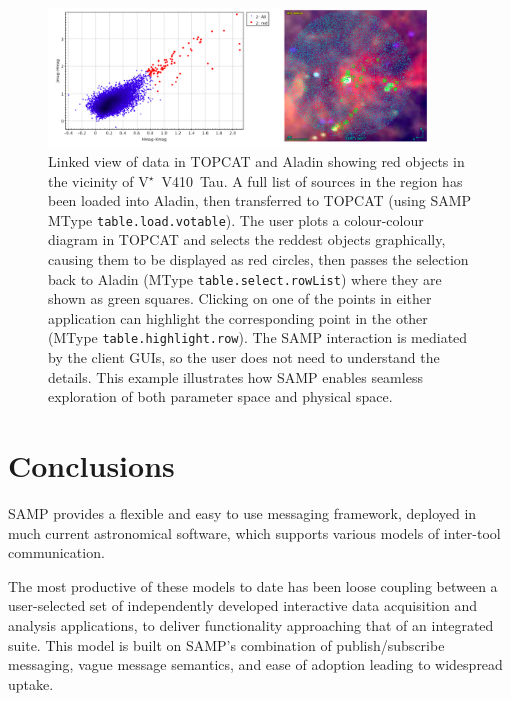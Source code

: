\documentclass[5p]{elsarticle}
\begin{document}
\begin{figure}
\begin{center}
\includegraphics[width=0.9\textwidth]{SAMP-AC_aladin-topcat.png}
\end{center}
\caption{\label{fig:linked}
Linked view of data in TOPCAT and Aladin showing
red objects in the vicinity of V$^{\star}$~V410~Tau.
A full list of sources in the region has been loaded
into Aladin, then transferred to TOPCAT
(using SAMP MType {\tt table.load.votable}).
The user plots a colour-colour diagram in TOPCAT
and selects the reddest objects graphically,
causing them to be displayed as red circles,
then passes the selection back to Aladin
(MType {\tt table.select.rowList}) where
they are shown as green squares.
Clicking on one of the points in either application can
highlight the corresponding point in the other
(MType {\tt table.highlight.row}).
The SAMP interaction is mediated by the client GUIs,
so the user does not need to understand the details.
This example illustrates how SAMP enables seamless exploration of both
parameter space and physical space.
}
\end{figure}


\section{Conclusions} \label{sec:conclusion}

SAMP provides a flexible and easy to use messaging framework,
deployed in much current astronomical software,
which supports various models of inter-tool communication.

The most productive of these models to date has been loose coupling
between a user-selected set of independently developed
interactive data acquisition and analysis applications,
to deliver functionality approaching that of an
integrated suite.
This model is built on SAMP's combination of
publish/subscribe messaging,
vague message semantics,
and ease of adoption leading to widespread uptake.
\end{document}
